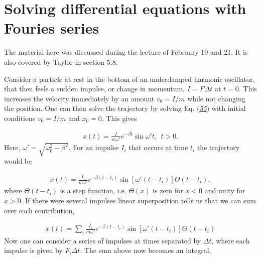 \documentclass[letterpaper,10pt,english]{sphinxmanual}
\begin{document}
\section{Solving differential equations with Fouries series}
\label{\detokenize{chapter1:solving-differential-equations-with-fouries-series}}
The material here was discussed during the lecture of February 19 and 21.
It is also covered by Taylor in section 5.8.

Consider a particle at rest in the bottom of an underdamped harmonic
oscillator, that then feels a sudden impulse, or change in momentum,
\(I=F\Delta t\) at \(t=0\). This increases the velocity immediately by an
amount \(v_0=I/m\) while not changing the position. One can then solve
the trajectory by solving Eq. ({\hyperref[\detokenize{chapter1:eq:homogsolution}]{\emph{55}}}) with initial
conditions \(v_0=I/m\) and \(x_0=0\). This gives




\begin{equation*}
\begin{split}
\begin{equation}
x(t)=\frac{I}{m\omega'}e^{-\beta t}\sin\omega't, ~~t>0.
\label{_auto65} \tag{87}
\end{equation}
\end{split}
\end{equation*}
Here, \(\omega'=\sqrt{\omega_0^2-\beta^2}\). For an impulse \(I_i\) that
occurs at time \(t_i\) the trajectory would be




\begin{equation*}
\begin{split}
\begin{equation}
x(t)=\frac{I_i}{m\omega'}e^{-\beta (t-t_i)}\sin[\omega'(t-t_i)] \Theta(t-t_i),
\label{_auto66} \tag{88}
\end{equation}
\end{split}
\end{equation*}
where \(\Theta(t-t_i)\) is a step function, i.e. \(\Theta(x)\) is zero for
\(x<0\) and unity for \(x>0\). If there were several impulses linear
superposition tells us that we can sum over each contribution,




\begin{equation*}
\begin{split}
\begin{equation}
x(t)=\sum_i\frac{I_i}{m\omega'}e^{-\beta(t-t_i)}\sin[\omega'(t-t_i)]\Theta(t-t_i)
\label{_auto67} \tag{89}
\end{equation}
\end{split}
\end{equation*}
Now one can consider a series of impulses at times separated by
\(\Delta t\), where each impulse is given by \(F_i\Delta t\). The sum
above now becomes an integral,
\end{document}

